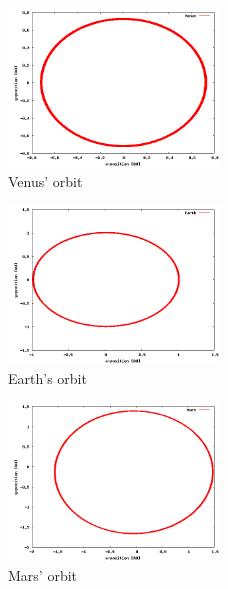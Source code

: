 \documentclass[a4wide,12pt]{article}
\begin{document}
\begin{figure}[p]
 \includegraphics[width=0.5\textwidth]{venus}
 \caption{Venus' orbit}
 \label{fig:21} 
\end{figure}

\begin{figure}[p]
 \includegraphics[width=0.5\textwidth]{Earth}
 \caption{Earth's orbit}
 \label{fig:22} 
\end{figure}

\begin{figure}[p]
 \includegraphics[width=0.5\textwidth]{Mars}
 \caption{Mars' orbit}
 \label{fig:23} 
\end{figure}
\end{document}
